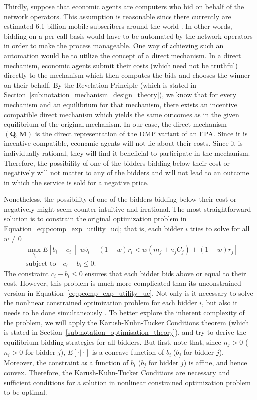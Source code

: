 Thirdly, suppose that economic agents are computers who bid on behalf of the network operators. This assumption is reasonable since there currently are estimated 6.1 billion mobile subscribers around the world \cite{Ericsson2011}. In other words, bidding on a per call basis would have to be automated by the network operators in order to make the process manageable. One way of achieving such an automation would be to utilize the concept of a direct mechanism. In a direct mechanism, economic agents submit their costs (which need not be truthful) directly to the mechanism which then computes the bids and chooses the winner on their behalf. By the Revelation Principle (which is stated in Section~\ref{sub:notation_mechanism_design_theory}), we know that for every mechanism and an equilibrium for that mechanism, there exists an incentive compatible direct mechanism which yields the same outcomes as in the given equilibrium of the original mechanism. In our case, the direct mechanism $(\mathbf{Q},\mathbf{M})$ is the direct representation of the DMP variant of an FPA. Since it is incentive compatible, economic agents will not lie about their costs. Since it is individually rational, they will find it beneficial to participate in the mechanism. Therefore, the possibility of one of the bidders bidding below their cost or negatively will not matter to any of the bidders and will not lead to an outcome in which the service is sold for a negative price.

Nonetheless, the possibility of one of the bidders bidding below their cost or negatively might seem counter-intuitive and irrational. The most straightforward solution is to constrain the original optimization problem in Equation~\eqref{eq:pcomp_exp_utility_uc}; that is, each bidder $i$ tries to solve for all $w\neq 0$
\begin{align}
	\label{eq:pcomp_exp_utility_c}
	&\max_{b_i}E \left[ b_i-c_i \:\middle\vert\: wb_i + (1-w)r_i < w(m_j + n_j C_j) + (1-w)r_j\right]\\
	&\text{subject to}\quad c_i-b_i\le 0.\nonumber
\end{align}
The constraint $c_i-b_i\le 0$ ensures that each bidder bids above or equal to their cost. However, this problem is much more complicated than its unconstrained version in Equation~\eqref{eq:pcomp_exp_utility_uc}. Not only is it necessary to solve the nonlinear constrained optimization problem for each bidder $i$, but also it needs to be done simultaneously \cite{Griffin2011}. To better explore the inherent complexity of the problem, we will apply the Karush-Kuhn-Tucker Conditions theorem (which is stated in Section~\ref{sub:notation_optimisation_theory}), and try to derive the equilibrium bidding strategies for all bidders. But first, note that, since $n_j>0$ ($n_i>0$ for bidder $j$), $E[\cdot \vert \cdot]$ is a concave function of $b_i$ ($b_j$ for bidder $j$). Moreover, the constraint as a function of $b_i$ ($b_j$ for bidder $j$) is affine, and hence convex. Therefore, the Karush-Kuhn-Tucker Conditions are necessary and sufficient conditions for a solution in nonlinear constrained optimization problem to be optimal.

